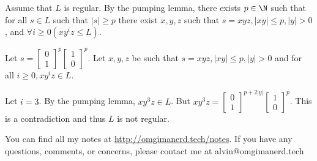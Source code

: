\documentclass{math}
\begin{document}
Assume that \( L \) is regular. By the pumping lemma, there exists \( p\in\N \)
such that for all \( s\in L \) such that \( |s|\ge p \) there exist \( x,y,z \)
such that \( s = xyz, |xy|\le p, |y|>0 \), and \( \forall{i}\ge0(xy^iz\le L) \).
\par
Let \( s = \begin{bmatrix}0 \\ 1\end{bmatrix}^p
\begin{bmatrix}1 \\ 0\end{bmatrix}^p \). Let \( x,y,z \) be such that
\( s = xyz, |xy|\le p, |y|>0 \) and for all \( i\ge0, xy^iz\in L \). \par
Let \( i = 3 \). By the pumping lemma, \( xy^3z\in L \). But \( xy^3z =
\begin{bmatrix}0 \\ 1\end{bmatrix}^{p+2|y|}
\begin{bmatrix}1 \\ 0\end{bmatrix}^p \). This is a contradiction and thus
\( L \) is not regular.

\begin{center}
  You can find all my notes at \url{http://omgimanerd.tech/notes}. If you have
  any questions, comments, or concerns, please contact me at
  alvin@omgimanerd.tech
\end{center}
\end{document}

